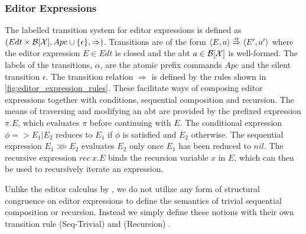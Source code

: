 \documentclass[sigplan,screen]{acmart}
\begin{document}
\subsubsection{Editor Expressions} \label{sec:Semantics}
The labelled transition system for editor expressions is defined as $(Edt \times \mathcal{B}[\mathcal{X} ], Apc \cup \{\epsilon\}, \Rightarrow)$. Transitions are of the form $\langle E, a \rangle \stackrel{\alpha}{\Rightarrow} \langle E', a' \rangle$ where the editor expression $E \in Edt$ is closed and the abt $a \in \mathcal{B}[\mathcal{X} ]$ is well-formed. The labels of the transitions, $\alpha$, are the atomic prefix commands $Apc$ and the silent transition $\epsilon$. The transition relation $\Rightarrow$ is defined by the rules shown in \cref{fig:editor_expression_rules}. These facilitate ways of composing editor expressions together with conditions, sequential composition and recursion. The means of traversing and modifying an abt are provided by the prefixed expression $\pi.E$, which evaluates $\pi$ before continuing with $E$. The conditional expression $\phi => E_1|E_2$ reduces to $E_1$ if $\phi$ is satisfied and $E_2$ otherwise. The sequential expression $E_1 \ggg E_2$ evaluates $E_2$ only once $E_1$ has been reduced to $nil$. The recursive expression $rec \ x.E$ binds the recursion variable $x$ in $E$, which can then be used to recursively iterate an expression.

Unlike the editor calculus by \cite{type_safe_structure_editor}, we do not utilize any form of structural congruence on editor expressions to define the semantics of trivial sequential composition or recursion. Instead we simply define these notions with their own transition rule (Seq-Trivial) and (Recursion)
.
\end{document}
